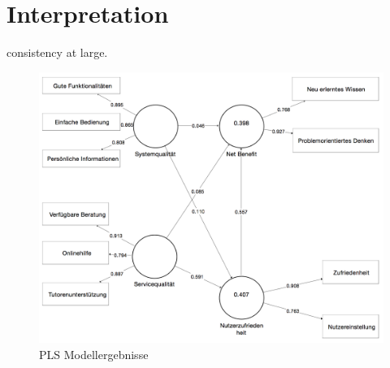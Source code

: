 \section{Interpretation}
\label{sec:vergleich}

\todo consistency at large. 




\begin{figure}[h]
\centering
\includegraphics[width=1\textwidth]{Grafiken/pls_bw.png}
\caption{PLS Modellergebnisse}
\label{PLS Modellergebnisse}
\end{figure}